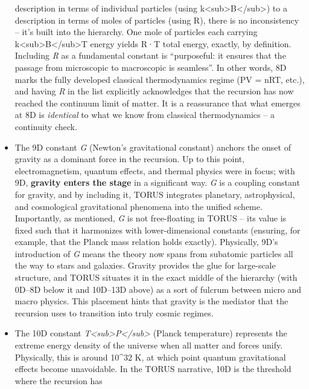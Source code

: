 \documentclass[
]{article}
\begin{document}
\begin{itemize}
  description in terms of individual particles (using
  k\textless sub\textgreater B\textless/sub\textgreater) to a
  description in terms of moles of particles (using R), there is no
  inconsistency -- it's built into the hierarchy. One mole of particles
  each carrying k\textless sub\textgreater B\textless/sub\textgreater T
  energy yields R·T total energy, exactly, by definition. Including
  \emph{R} as a fundamental constant is ``purposeful: it ensures that
  the passage from microscopic to macroscopic is seamless''\hspace{0pt}.
  In other words, 8D marks the fully developed classical thermodynamics
  regime (PV = nRT, etc.), and having \emph{R} in the list explicitly
  acknowledges that the recursion has now reached the continuum limit of
  matter. It is a reassurance that what emerges at 8D is
  \emph{identical} to what we know from classical thermodynamics -- a
  continuity check.
\item
  The 9D constant \emph{G} (Newton's gravitational constant) anchors the
  onset of gravity as a dominant force in the recursion. Up to this
  point, electromagnetism, quantum effects, and thermal physics were in
  focus; with 9D, \textbf{gravity enters the stage} in a significant
  way. \emph{G} is a coupling constant for gravity, and by including it,
  TORUS integrates planetary, astrophysical, and cosmological
  gravitational phenomena into the unified scheme. Importantly, as
  mentioned, \emph{G} is not free-floating in TORUS -- its value is
  fixed such that it harmonizes with lower-dimensional constants
  (ensuring, for example, that the Planck mass relation holds
  exactly)\hspace{0pt}. Physically, 9D's introduction of \emph{G} means
  the theory now spans from subatomic particles all the way to stars and
  galaxies. Gravity provides the glue for large-scale structure, and
  TORUS situates it in the exact middle of the hierarchy (with 0D--8D
  below it and 10D--13D above) as a sort of fulcrum between micro and
  macro physics. This placement hints that gravity is the mediator that
  the recursion uses to transition into truly cosmic regimes.
\item
  The 10D constant
  \emph{T\textless sub\textgreater P\textless/sub\textgreater{}} (Planck
  temperature) represents the extreme energy density of the universe
  when all matter and forces unify. Physically, this is around 10\^{}32
  K, at which point quantum gravitational effects become unavoidable. In
  the TORUS narrative, 10D is the threshold where the recursion has

\end{itemize}
\end{document}
